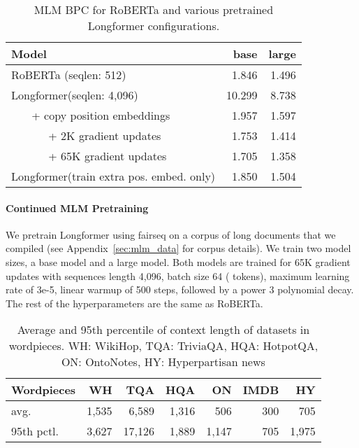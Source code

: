 \documentclass[11pt,a4paper]{article}
\newcommand{\model}{Longformer\xspace}
\newcommand{\seqlen}{4,096\xspace}
\begin{document}
\begin{table}[t]
    \centering
    \small
    \begin{tabular}{@{}lrr@{}}
    \toprule
    Model &  base & large\\
    \midrule
    RoBERTa (seqlen: 512)  & 1.846 & 1.496 \\
    \model  (seqlen: \seqlen) & 10.299 & 8.738 \\
    ~~~ + copy position embeddings & 1.957 & 1.597\\
    ~~~~~~ + 2K gradient updates & 1.753 & 1.414 \\
    ~~~~~~ + 65K gradient updates & 1.705 & 1.358\\
\model (train extra pos. embed. only) & 1.850 & 1.504 \\
    \bottomrule
    \end{tabular}
    \caption{MLM BPC for RoBERTa and various pretrained \model configurations. 
}
    \label{tab:roberta}
\end{table}



\paragraph{Continued MLM Pretraining}


We pretrain \model using fairseq \cite{ott2019fairseq} on a corpus of long documents that we compiled (see Appendix~\ref{sec:mlm_data} for corpus details).
We train two model sizes, a base model and a large model.
Both models are trained for 65K gradient updates with sequences length \seqlen, batch size 64 ( tokens), maximum learning rate of 3e-5, linear warmup of 500 steps, followed by a power 3 polynomial decay. The rest of the hyperparameters are the same as RoBERTa. 


\begin{table}[t]
    \centering
    \small
    \setlength{\tabcolsep}{3pt} 
    \begin{tabular}{@{}lrrrrrr@{}}
    \toprule
    Wordpieces & WH & TQA & HQA & ON & IMDB & HY \\ \midrule
    avg.    & 1,535 & 6,589 & 1,316 & 506 & 300 & 705   \\
    95th pctl.     & 3,627 & 17,126 & 1,889 & 1,147 & 705 & 1,975 \\ \bottomrule
    \end{tabular}
    \caption{Average and 95th percentile of context length of datasets in wordpieces. WH: WikiHop, TQA: TriviaQA, HQA: HotpotQA, ON: OntoNotes, HY: Hyperpartisan news} 
    \label{tab:doc-len}
\end{table}
\end{document}
